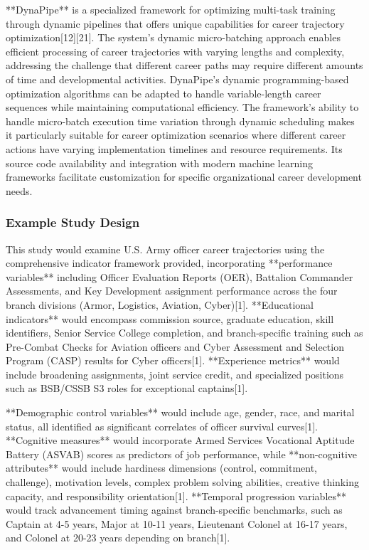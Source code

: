\documentclass[main.tex]{subfiles}
\begin{document}
**DynaPipe** is a specialized framework for optimizing multi-task training through dynamic pipelines that offers unique capabilities for career trajectory optimization[12][21]. The system's dynamic micro-batching approach enables efficient processing of career trajectories with varying lengths and complexity, addressing the challenge that different career paths may require different amounts of time and developmental activities. DynaPipe's dynamic programming-based optimization algorithms can be adapted to handle variable-length career sequences while maintaining computational efficiency. The framework's ability to handle micro-batch execution time variation through dynamic scheduling makes it particularly suitable for career optimization scenarios where different career actions have varying implementation timelines and resource requirements. Its source code availability and integration with modern machine learning frameworks facilitate customization for specific organizational career development needs.

\subsubsection{Example Study Design}


This study would examine U.S. Army officer career trajectories using the comprehensive indicator framework provided, incorporating **performance variables** including Officer Evaluation Reports (OER), Battalion Commander Assessments, and Key Development assignment performance across the four branch divisions (Armor, Logistics, Aviation, Cyber)[1]. **Educational indicators** would encompass commission source, graduate education, skill identifiers, Senior Service College completion, and branch-specific training such as Pre-Combat Checks for Aviation officers and Cyber Assessment and Selection Program (CASP) results for Cyber officers[1]. **Experience metrics** would include broadening assignments, joint service credit, and specialized positions such as BSB/CSSB S3 roles for exceptional captains[1].

**Demographic control variables** would include age, gender, race, and marital status, all identified as significant correlates of officer survival curves[1]. **Cognitive measures** would incorporate Armed Services Vocational Aptitude Battery (ASVAB) scores as predictors of job performance, while **non-cognitive attributes** would include hardiness dimensions (control, commitment, challenge), motivation levels, complex problem solving abilities, creative thinking capacity, and responsibility orientation[1]. **Temporal progression variables** would track advancement timing against branch-specific benchmarks, such as Captain at 4-5 years, Major at 10-11 years, Lieutenant Colonel at 16-17 years, and Colonel at 20-23 years depending on branch[1].
\end{document}
